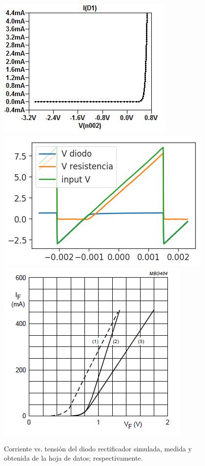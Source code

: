 \begin{figure}[!ht]
\centering
\includegraphics[scale=0.62]{../EJ1/DiodoRectificador/corrienteDiodo1}
\includegraphics[scale=0.45]{../EJ1/DiodoRectificador/datosOsciloscopio}
\includegraphics[scale=0.52]{../EJ1/DiodoRectificador/corrienteDiodoDatasheet}

\caption{Corriente vs. tensi\'on del diodo rectificador simulada, medida y obtenida de la hoja de datos; respectivamente.}
\label{med1c}
\end{figure}


